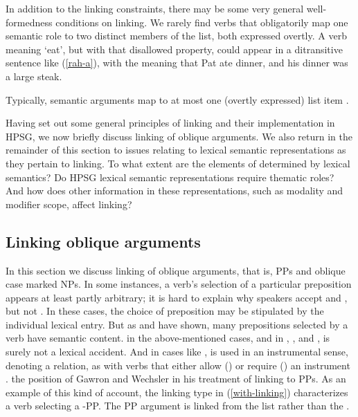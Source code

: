 \documentclass[output=paper
 	        ,biblatex
                ,babelshorthands
                ,newtxmath
                ,draftmode
                ,colorlinks, citecolor=brown
]{langscibook}
\begin{document}
In addition to the linking constraints, there may be some very general well-formedness conditions on
linking. We rarely find verbs that obligatorily map  one semantic role to two  distinct members of
the \argst list, both expressed overtly.  A verb meaning `eat', but  with that disallowed property,
could appear in a ditransitive sentence like  (\ref{rah-a}), with the meaning that Pat ate dinner,
and his dinner was a large steak.

\begin{exe}
\end{exe}

\noindent
Typically, semantic arguments map to at most one (overtly expressed) \argst list item \citep[262--268]{Davis2001}.

Having set out some general principles of linking and their implementation in HPSG, we now briefly discuss linking of oblique arguments.
We also return in the remainder of this section to issues relating to lexical semantic representations as they pertain to linking.
To what extent are the elements of \argst determined by lexical semantics?
Do HPSG lexical semantic representations require thematic roles?
And how does other information in these representations, such as modality and modifier scope, affect linking?

\subsection{Linking oblique arguments}
In this section we discuss linking of oblique arguments, that is, PPs and oblique case marked NPs.
In some instances, a verb's selection of a particular preposition appears at least partly arbitrary;
it is hard to explain why  speakers accept  and , but  not .
In these cases, the choice of preposition may be stipulated by the individual lexical entry.
But as \citet{Gawron1986} and \citet{Wechsler1995} have shown, many prepositions selected by a verb have semantic content.
 in the above-mentioned cases, and in , , and , is surely not a lexical accident.
And in  cases like ,  is used in an instrumental sense, denoting a  relation, as with verbs that either allow () or require () an instrument \citep{KoenigandDavis2006}.
 the position of Gawron and Wechsler in his treatment of linking to PPs.
As an example of this kind of account, the linking type in (\ref{with-linking}) characterizes a verb selecting a -PP. 
The PP argument is linked from the \rels list rather than the .
\end{document}
